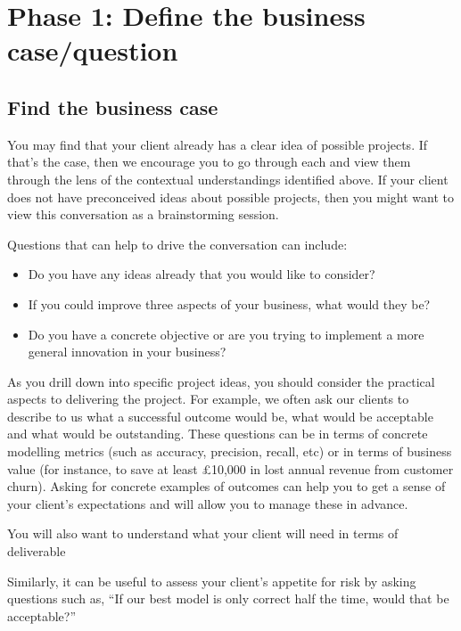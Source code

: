 \documentclass[
]{book}
\providecommand{\tightlist}{%
  \setlength{\itemsep}{0pt}\setlength{\parskip}{0pt}}
\begin{document}
\hypertarget{phase-1-define-the-business-casequestion}{%
\section{Phase 1: Define the business
case/question}\label{phase-1-define-the-business-casequestion}}

\hypertarget{find-the-business-case}{%
\subsection{Find the business case}\label{find-the-business-case}}

You may find that your client already has a clear idea of possible
projects. If that's the case, then we encourage you to go through each
and view them through the lens of the contextual understandings
identified above. If your client does not have preconceived ideas about
possible projects, then you might want to view this conversation as a
brainstorming session.

Questions that can help to drive the conversation can include:

\begin{itemize}
\tightlist
\item
  Do you have any ideas already that you would like to consider?
\item
  If you could improve three aspects of your business, what would they
  be?
\item
  Do you have a concrete objective or are you trying to implement a more
  general innovation in your business?
\end{itemize}

As you drill down into specific project ideas, you should consider the
practical aspects to delivering the project. For example, we often ask
our clients to describe to us what a successful outcome would be, what
would be acceptable and what would be outstanding. These questions can
be in terms of concrete modelling metrics (such as accuracy, precision,
recall, etc) or in terms of business value (for instance, to save at
least £10,000 in lost annual revenue from customer churn). Asking for
concrete examples of outcomes can help you to get a sense of your
client's expectations and will allow you to manage these in advance.

You will also want to understand what your client will need in terms of
deliverable

Similarly, it can be useful to assess your client's appetite for risk by
asking questions such as, ``If our best model is only correct half the
time, would that be acceptable?''
\end{document}

